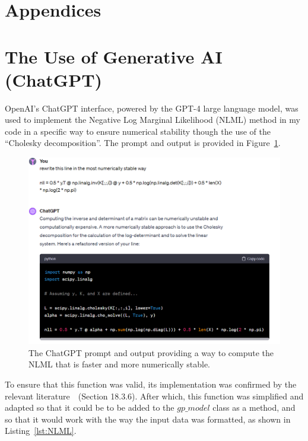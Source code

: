 \appendix
\section*{Appendices}
\renewcommand{\thelstlisting}{\thesection.\arabic{lstlisting}}
\setcounter{lstlisting}{0}
\section{The Use of Generative AI (ChatGPT)}
\label{app:GPT}
OpenAI's ChatGPT interface, powered by the GPT-4 large language model, was used to implement the Negative Log Marginal Likelihood (NLML) method in my code in a specific way to ensure numerical stability though the use of the ``Cholesky decomposition''.
The prompt and output is provided in Figure~\ref{fig:chat-NLML}.
\begin{figure}[htbp]
    \centering
    \includegraphics[width=1\linewidth]{figures/chat-NLML/chat-NLML.png}
    \caption{The ChatGPT prompt and output providing a way to compute the NLML that is faster and more numerically stable.}
    \label{fig:chat-NLML}
\end{figure}

\FloatBarrier

To ensure that this function was valid, its implementation was confirmed by the relevant literature~\cite{murphy2023probabilistic}~(Section 18.3.6).
After which, this function was simplified and adapted so that it could be to be added to the $gp\_model$ class as a method, and so that it would work with the way the input data was formatted, as shown in Listing~\ref{lst:NLML}.


